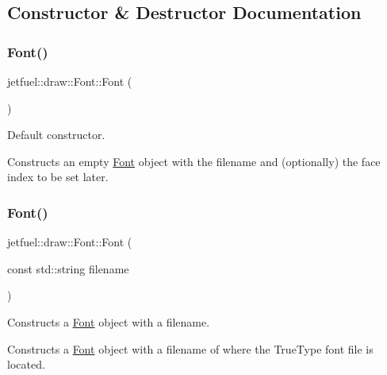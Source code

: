 \subsection{Constructor \& Destructor Documentation}
\mbox{\label{classjetfuel_1_1draw_1_1Font_a1054eb031ce0e8485f828f5ae7463770}} 
\subsubsection{\texorpdfstring{Font()}{Font()}\hspace{0.1cm}{\footnotesize\ttfamily [1/3]}}
{\footnotesize\ttfamily jetfuel\+::draw\+::\+Font\+::\+Font (\begin{DoxyParamCaption}{ }\end{DoxyParamCaption})\hspace{0.3cm}{\ttfamily [inline]}}



Default constructor. 

Constructs an empty \hyperlink{classjetfuel_1_1draw_1_1Font}{Font} object with the filename and (optionally) the face index to be set later. \mbox{\label{classjetfuel_1_1draw_1_1Font_a96db43b28c32511ff481502ec8d11fd7}} 
\subsubsection{\texorpdfstring{Font()}{Font()}\hspace{0.1cm}{\footnotesize\ttfamily [2/3]}}
{\footnotesize\ttfamily jetfuel\+::draw\+::\+Font\+::\+Font (\begin{DoxyParamCaption}\item[{const std\+::string}]{filename }\end{DoxyParamCaption})}



Constructs a \hyperlink{classjetfuel_1_1draw_1_1Font}{Font} object with a filename. 

Constructs a \hyperlink{classjetfuel_1_1draw_1_1Font}{Font} object with a filename of where the True\+Type font file is located.


